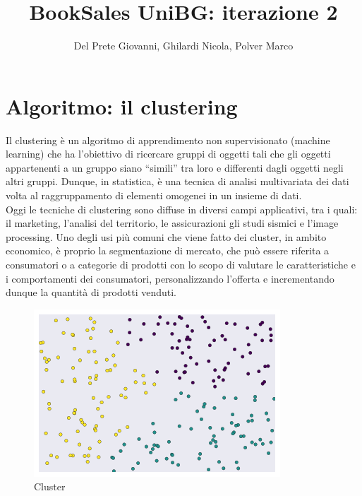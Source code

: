 \documentclass[10pt,a4paper]{report}
\author{Del Prete Giovanni, Ghilardi Nicola, Polver Marco}
\title{BookSales UniBG: iterazione 2}
\begin{document}
\maketitle
	\tableofcontents
	\section{Algoritmo: il clustering}
	Il clustering è un algoritmo di apprendimento non supervisionato (machine learning) che ha l'obiettivo di ricercare gruppi di oggetti tali che  
	gli oggetti appartenenti a un gruppo siano “simili” tra loro e differenti dagli oggetti negli altri gruppi. Dunque, in statistica, è una tecnica di 
        analisi multivariata dei dati volta al raggruppamento di elementi omogenei in un insieme di dati.\\
        Oggi le tecniche di clustering sono diffuse in diversi campi applicativi, tra i quali: il marketing, l'analisi del territorio, le assicurazioni  gli studi sismici e l'image processing.  Uno degli usi più comuni che viene fatto dei cluster, in ambito economico, 
        è proprio la segmentazione di mercato, che può essere riferita a consumatori o a categorie di prodotti con lo scopo di valutare le caratteristiche e i comportamenti dei consumatori, personalizzando l’offerta
        e incrementando dunque la quantità di prodotti venduti.
        \begin{figure}[H]
		\centering
		\includegraphics[scale=0.9]{Cluster.png}
		\caption{Cluster}
		\end{figure}
		\newpage
\end{document}
